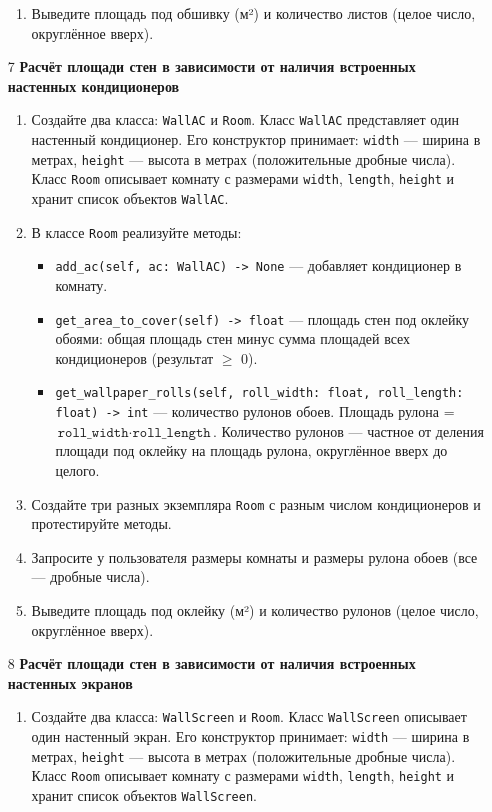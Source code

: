 \begin{enumerate}
\begin{enumerate}
    \item Выведите площадь под обшивку (м²) и количество листов (целое число, округлённое вверх).
\end{enumerate}

\item[7] \textbf{Расчёт площади стен в зависимости от наличия встроенных настенных кондиционеров}
\begin{enumerate}
    \item Создайте два класса: \texttt{WallAC} и \texttt{Room}.  
    Класс \texttt{WallAC} представляет один настенный кондиционер. Его конструктор принимает:  
    \texttt{width} — ширина в метрах,  
    \texttt{height} — высота в метрах (положительные дробные числа).  
    Класс \texttt{Room} описывает комнату с размерами \texttt{width}, \texttt{length}, \texttt{height} и хранит список объектов \texttt{WallAC}.

    \item В классе \texttt{Room} реализуйте методы:  
    \begin{itemize}
        \item \texttt{add\_ac(self, ac: WallAC) -> None} — добавляет кондиционер в комнату.
        \item \texttt{get\_area\_to\_cover(self) -> float} — площадь стен под оклейку обоями: общая площадь стен минус сумма площадей всех кондиционеров (результат $\geqslant$ 0).
        \item \texttt{get\_wallpaper\_rolls(self, roll\_width: float, roll\_length: float) -> int} — количество рулонов обоев. Площадь рулона = \(\texttt{roll\_width} \cdot \texttt{roll\_length}\). Количество рулонов — частное от деления площади под оклейку на площадь рулона, округлённое вверх до целого.
    \end{itemize}

    \item Создайте три разных экземпляра \texttt{Room} с разным числом кондиционеров и протестируйте методы.

    \item Запросите у пользователя размеры комнаты и размеры рулона обоев (все — дробные числа).

    \item Выведите площадь под оклейку (м²) и количество рулонов (целое число, округлённое вверх).
\end{enumerate}

\item[8] \textbf{Расчёт площади стен в зависимости от наличия встроенных настенных экранов}
\begin{enumerate}
    \item Создайте два класса: \texttt{WallScreen} и \texttt{Room}.  
    Класс \texttt{WallScreen} описывает один настенный экран. Его конструктор принимает:  
    \texttt{width} — ширина в метрах,  
    \texttt{height} — высота в метрах (положительные дробные числа).  
    Класс \texttt{Room} описывает комнату с размерами \texttt{width}, \texttt{length}, \texttt{height} и хранит список объектов \texttt{WallScreen}.


\end{enumerate}
\end{enumerate}
